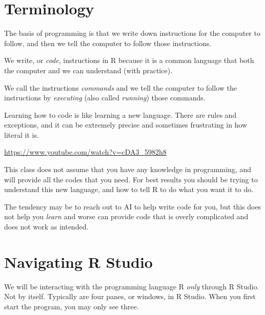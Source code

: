 \documentclass[
  letterpaper,
  DIV=11,
  numbers=noendperiod,
  oneside]{scrreprt}
\begin{document}
\section{Terminology}\label{terminology}

The basis of programming is that we write down instructions for the
computer to follow, and then we tell the computer to follow those
instructions.

We write, or \emph{code}, instructions in R because it is a common
language that both the computer and we can understand (with practice).

We call the instructions \emph{commands} and we tell the computer to
follow the instructions by \emph{executing} (also called \emph{running})
those commands.

Learning how to code is like learning a new language. There are rules
and exceptions, and it can be extremely precise and sometimes
frustrating in how literal it is.

{}
\url{https://www.youtube.com/watch?v=cDA3_5982h8}

\begin{tcolorbox}[enhanced jigsaw, rightrule=.15mm, arc=.35mm, bottomrule=.15mm, leftrule=.75mm, breakable, colframe=quarto-callout-note-color-frame, left=2mm, toprule=.15mm, opacityback=0, colback=white]

This class does not assume that you have any knowledge in programming,
and will provide all the codes that you need. For best results you
should be trying to understand this new language, and how to tell R to
do what you want it to do.

The tendency may be to reach out to AI to help write code for you, but
this does not help you \emph{learn} and worse can provide code that is
overly complicated and does not work as intended.

\end{tcolorbox}

\section{Navigating R Studio}\label{sec-nav_Rstudio}

We will be interacting with the programming language R \emph{only}
through R Studio. Not by itself. Typically are four panes, or windows,
in R Studio. When you first start the program, you may only see three.
\end{document}
